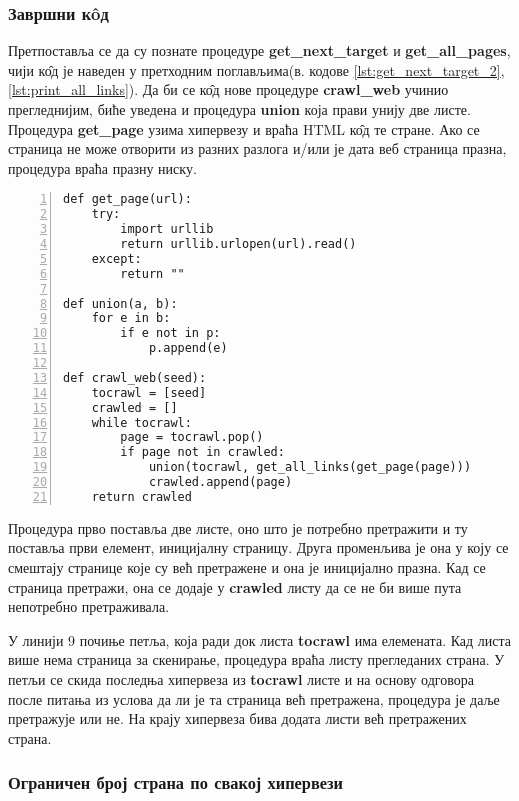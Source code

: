 \subsubsection{Завршни к\^oд}

Претпоставља се да су познате процедуре \textbf{get\_next\_target} и \textbf{get\_all\_pages}, чији к\^{о}д је наведен у претходним поглављима(в. кодове \ref{lst:get_next_target_2}, \ref{lst:print_all_links}). Да би се к\^{о}д нове процедуре \textbf{crawl\_web} учинио прегледнијим, биће уведена и процедура \textbf{union} која прави унију две листе. Процедура \textbf{get\_page}  узима хипервезу и враћа HTML к\^{о}д те стране. Ако се страница не може отворити из разних разлога и/или је дата веб страница празна, процедура враћа празну ниску.

\begin{lstlisting}[caption=Веб-паук, label={lst:crawlweb1}, numbers=left]
def get_page(url):
    try:
        import urllib
        return urllib.urlopen(url).read()
    except:
        return ""

def union(a, b):
    for e in b:
        if e not in p:
            p.append(e)

def crawl_web(seed):
    tocrawl = [seed]
    crawled = []
    while tocrawl:
        page = tocrawl.pop()
        if page not in crawled:
            union(tocrawl, get_all_links(get_page(page)))
            crawled.append(page)
    return crawled
\end{lstlisting}

Процедура прво поставља две листе, оно што је потребно претражити и ту поставља први елемент, иницијалну страницу. Друга променљива је она у коју се смештају странице које су већ претражене и она је иницијално празна. Кад се страница претражи, она се додаје у \textbf{crawled} листу да се не би више пута непотребно претраживала.

У линији 9 почиње петља, која ради док листа \textbf{tocrawl} има елемената. Кад листа више нема страница за скенирање, процедура враћа листу прегледаних страна. У петљи се скида последња хипервеза из \textbf{tocrawl} листе и на основу одговора после питања из услова да ли је та страница већ претражена, процедура је даље претражује или не. На крају хипервеза бива додата листи већ претражених страна.

\subsubsection{Ограничен број страна по свакој хипервези}

